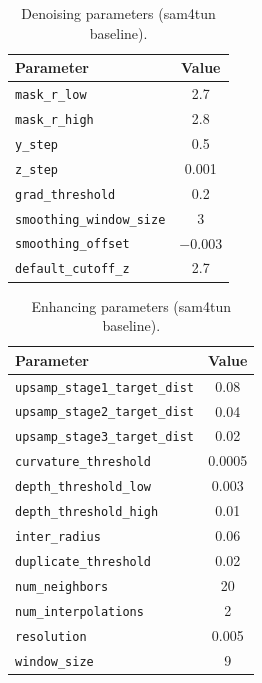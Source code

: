 \documentclass[a4paper,fleqn]{cas-dc}
\begin{document}
\begin{table}[ht]
\caption{Denoising parameters (sam4tun baseline).}\label{tab:denoise-params}
\begin{tabular*}{\tblwidth}{@{} l c @{}}
\toprule
Parameter & Value \\
\midrule
\texttt{mask\_r\_low} & 2.7 \\
\texttt{mask\_r\_high} & 2.8 \\
\texttt{y\_step} & 0.5 \\
\texttt{z\_step} & 0.001 \\
\texttt{grad\_threshold} & 0.2 \\
\texttt{smoothing\_window\_size} & 3 \\
\texttt{smoothing\_offset} & $-0.003$ \\
\texttt{default\_cutoff\_z} & 2.7 \\
\bottomrule
\end{tabular*}
\end{table}

\begin{table}[ht]
\caption{Enhancing parameters (sam4tun baseline).}\label{tab:enhance-params}
\begin{tabular*}{\tblwidth}{@{} l c @{}}
\toprule
Parameter & Value \\
\midrule
\texttt{upsamp\_stage1\_target\_dist} & 0.08 \\
\texttt{upsamp\_stage2\_target\_dist} & 0.04 \\
\texttt{upsamp\_stage3\_target\_dist} & 0.02 \\
\texttt{curvature\_threshold} & 0.0005 \\
\texttt{depth\_threshold\_low} & 0.003 \\
\texttt{depth\_threshold\_high} & 0.01 \\
\texttt{inter\_radius} & 0.06 \\
\texttt{duplicate\_threshold} & 0.02 \\
\texttt{num\_neighbors} & 20 \\
\texttt{num\_interpolations} & 2 \\
\texttt{resolution} & 0.005 \\
\texttt{window\_size} & 9 \\
\bottomrule
\end{tabular*}
\end{table}
\end{document}
